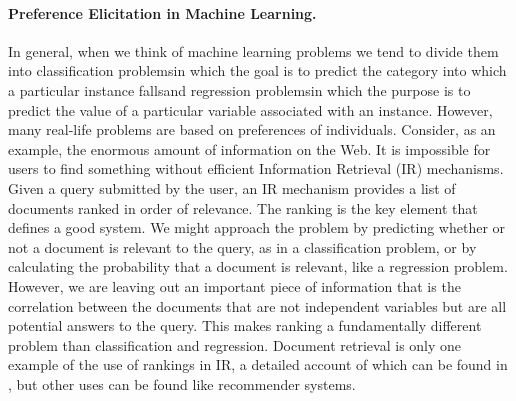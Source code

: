 \paragraph{Preference Elicitation in Machine Learning.}
In general, when we think of machine learning problems we tend to divide them into classification problems\textemdash in which the goal is to predict the category into which a particular instance falls\textemdash and regression problems\textemdash in which the purpose is to predict the value of a particular variable associated with an instance. 
However, many real-life problems are based on preferences of individuals.
Consider, as an example, the enormous amount of information on the Web. It is impossible for users to find something without efficient Information Retrieval (IR) mechanisms. Given a query submitted by the user, an IR mechanism provides a list of documents ranked in order of relevance. The ranking is the key element that defines a good system. 
We might approach the problem by predicting whether or not a document is relevant to the query, as in a classification problem, or by calculating the probability that a document is relevant, like a regression problem. However, we are leaving out an important piece of information that is the correlation between the documents that are not independent variables but are all potential answers to the query. This makes ranking a fundamentally different problem than classification and regression.
Document retrieval is only one example of the use of rankings in IR, a detailed account of which can be found in \citet{Liu2009}, but other uses can be found like recommender systems.

